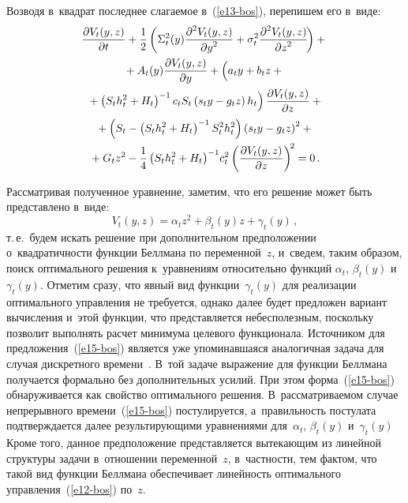 \begin{multicols}{2}
     Возводя в~квадрат по\-след\-нее сла\-га\-емое в~(\ref{e13-bos}), перепишем 
его в~виде:
     \begin{multline}
     \fr{\partial V_t(y,z)}{\partial t} +\fr{1}{2}\left( \Sigma_t^2(y) \fr{\partial^2 
V_t(y,z)} {\partial y^2}+\sigma_t^2\fr{\partial^2 V_t(y,z)} {\partial 
z^2}\!\right)+{}\\
{}+A_t(y) \fr{\partial V_t(y,z)}{\partial y}
+ \left( 
\vphantom{\left( S_t h_t^2 +H_t\right)^{-1}}
a_t y+b_t z+{}\right.\\
\left.{}+\left( S_t h_t^2 +H_t\right)^{-1}
 c_t S_t \left( s_t y-g_t z\right) h_t
\right) 
     \fr{\partial V_t(y,z)}{\partial z}+{}\\
     {}+\left( S_t-\left( S_t h_t^2 +H_t\right)^{-1} S_t^2 h_t^2\right)\left( s_t y -
g_t z\right)^2+{}\\
     \!\!{}+
     G_t z^2 -\fr{1}{4}\left( S_t h_t^2+H_t\right)^{-1}\! c_t^2
     \left(\fr{\partial V_t(y,z)}{\partial z}\right)^{\!2}=0\,.\!\!
     \label{e14-bos}
     \end{multline}
     
     Рассматривая полученное уравнение, заметим, что его решение может 
быть пред\-став\-ле\-но в~виде:
   \begin{equation}
     V_t(y,z)= \alpha_t z^2+\beta_t(y) z +\gamma_t(y)\,,
     \label{e15-bos}
     \end{equation}
т.\,е.\ будем искать решение при дополнительном предположении 
о~квад\-ра\-тич\-ности функции Белл\-ма\-на по переменной~$z$, и~сведем, таким 
образом, поиск оптимального решения к~уравнениям относительно функций 
$\alpha_t$, $\beta_t(y)$ и~$\gamma_t(y)$. Отметим сразу, что явный вид 
функции~$\gamma_t(y)$ для реализации оптимального управ\-ле\-ния не 
требуется, однако далее будет предложен вариант вы\-чис\-ле\-ния и~этой 
функции, что пред\-став\-ля\-ет\-ся небесполезным, поскольку позволит выполнять 
расчет минимума целевого функционала. Источником для 
предложения~(\ref{e15-bos}) является уже упоминавшаяся аналогичная 
задача для случая дис\-крет\-но\-го времени~\cite{7-bos, 8-bos}. В~той задаче 
выражение для функции Беллмана получается формально без 
дополнительных усилий. При этом форма~(\ref{e15-bos}) обнаруживается 
как свойство оптимального решения. В~рассматриваемом случае 
непрерывного времени~(\ref{e15-bos}) постулируется, а~пра\-виль\-ность 
постулата под\-тверж\-да\-ет\-ся далее ре\-зуль\-ти\-ру\-ющи\-ми уравнениями 
для~$\alpha_t$, $\beta_t(y)$ и~$\gamma_t(y)$ Кроме того, данное 
предположение пред\-став\-ля\-ет\-ся вы\-те\-ка\-ющим из линейной структуры задачи 
в~отношении переменной~$z$, в~част\-ности, тем фактом, что такой вид 
функции Беллмана обеспечивает линейность оптимального 
управ\-ле\-ния~(\ref{e12-bos}) по~$z$.


\end{multicols}
